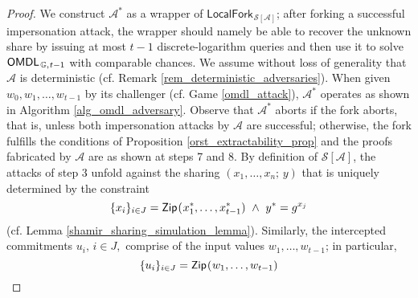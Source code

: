 \documentclass[10pt, psamsfonts, reqno]{amsart}
\theoremstyle{definition}
\theoremstyle{remark}
\numberwithin{equation}{section}
\begin{document}
\begin{proof}
We construct $\mathcal{A}^*$ as a wrapper of
$
\mathsf{LocalFork}_{
		\hspace{1pt}
    	\mathcal{S}\hspace{0pt}[
    		\hspace{0pt}
    		\mathcal{A}
    		\hspace{0pt}
    	]
    }
$;
after forking a successful impersonation attack,
the wrapper should namely be able to recover the unknown share
by issuing at most $t-1$ discrete-logarithm queries
and then use it to solve
$\mathsf{OMDL}_{\hspace{1pt}\mathbb{G},\hspace{0.5pt} t-1}$
with comparable chances.
We assume without loss of generality that $\mathcal{A}$
is deterministic (cf. Remark \ref{rem_deterministic_adversaries}).
When given $w_0, w_1, \dots, w_{t-1}$
by its challenger
(cf. Game \ref{omdl_attack}),
$\mathcal{A}^*$ operates as
shown in Algorithm \ref{alg_omdl_adversary}.
Observe that $\mathcal{A}^*$
aborts if the fork aborts,
that is, unless both impersonation attacks by $\mathcal{A}$
are successful;
otherwise, the fork fulfills the conditions of
Proposition \ref{orst_extractability_prop}
and the proofs fabricated by $\mathcal{A}$
are as shown at steps 7 and 8.
By definition of
$\mathcal{S}\hspace{0pt}[
 	\hspace{0pt}
    \mathcal{A}
    \hspace{0pt}
    ]
$,
the attacks of step 3
unfold against the sharing $(x_1, \dots, x_n;\hspace{2pt} y)$
that is uniquely determined by the constraint
\vspace{5pt}
\begin{equation}\label{mt_1}
\{x_i\}_{i \in J} =
\mathsf{Zip}\hspace{0.75pt}
(\hspace{0.5pt}x_1^*, \dots, x_{t-1}^*)
\ \land
\ y^* = g ^ {x_j}
\vspace{5pt}
\end{equation}
(cf. Lemma \ref{shamir_sharing_simulation_lemma}).
Similarly, the intercepted commitments
$u_i,\hspace{2pt} i \in J,$
comprise of the input values $w_1, \dots, w_{t-1}$;
in particular,
\vspace{3pt}
\begin{equation}\label{mt_2}
\{u_i\}_{i \in J} =
\mathsf{Zip}\hspace{0.75pt}
(\hspace{0.5pt}w_1, \dots, w_{t-1})

\end{equation}
\end{proof}
\end{document}
